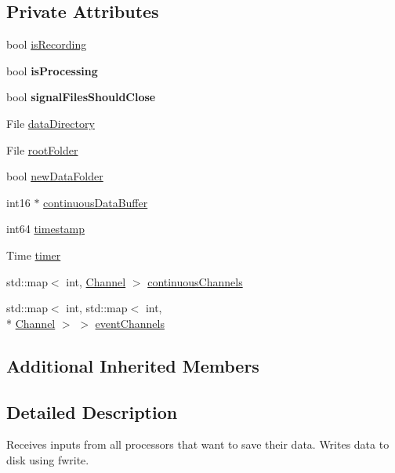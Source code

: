 \subsection*{Private Attributes}
\begin{DoxyCompactItemize}
\item 
bool \hyperlink{classRecordNode_a70adffca8ea1721773c80ad6c4a844e1}{is\-Recording}
\item 
\hypertarget{classRecordNode_a872f0369bb5a3eb28b0368efecdd27d5}{bool {\bfseries is\-Processing}}\label{classRecordNode_a872f0369bb5a3eb28b0368efecdd27d5}

\item 
\hypertarget{classRecordNode_a35774cd75d42f08f8bdec2132d0529e3}{bool {\bfseries signal\-Files\-Should\-Close}}\label{classRecordNode_a35774cd75d42f08f8bdec2132d0529e3}

\item 
File \hyperlink{classRecordNode_a5109feb0a2d1821616f3ff8ba04ee8e1}{data\-Directory}
\item 
File \hyperlink{classRecordNode_a6b6bbb72fc226f1de138175d575e62e1}{root\-Folder}
\item 
bool \hyperlink{classRecordNode_abc8b3b93a3912fa0c0ed6438508a7c78}{new\-Data\-Folder}
\item 
int16 $\ast$ \hyperlink{classRecordNode_a01ef6a171ab8d2a81e5cbc54293ca4cc}{continuous\-Data\-Buffer}
\item 
int64 \hyperlink{classRecordNode_a154d4c809090e282cdd99098c0d701c9}{timestamp}
\item 
Time \hyperlink{classRecordNode_a406bc13e786db7c14f1cd8b183ebc0e0}{timer}
\item 
std\-::map$<$ int, \hyperlink{structRecordNode_1_1Channel}{Channel} $>$ \hyperlink{classRecordNode_a5a1f8fe9e3100ab74d4bb2650be91f6d}{continuous\-Channels}
\item 
std\-::map$<$ int, std\-::map$<$ int, \\*
\hyperlink{structRecordNode_1_1Channel}{Channel} $>$ $>$ \hyperlink{classRecordNode_a1abec1e7ff14c068315ba3d661339553}{event\-Channels}
\end{DoxyCompactItemize}
\subsection*{Additional Inherited Members}


\subsection{Detailed Description}
Receives inputs from all processors that want to save their data. Writes data to disk using fwrite.

